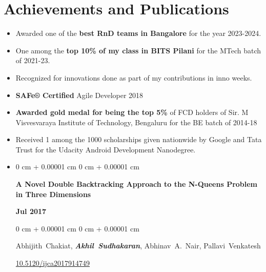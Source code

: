 \documentclass[10pt, letterpaper]{article}
\newenvironment{highlights}{
    \begin{itemize}[
        topsep=0.10 cm,
        parsep=0.10 cm,
        partopsep=0pt,
        itemsep=0pt,
        leftmargin=0 cm + 10pt
    ]
}{
    \end{itemize}
} %
\newenvironment{onecolentry}{
    \begin{adjustwidth}{
        0 cm + 0.00001 cm
    }{
        0 cm + 0.00001 cm
    }
}{
    \end{adjustwidth}
} %
\newenvironment{twocolentry}[2][]{
    \onecolentry
    \def\secondColumn{#2}
    \setcolumnwidth{\fill, 4.5 cm}
    \begin{paracol}{2}
}{
    \switchcolumn \raggedleft \secondColumn
    \end{paracol}
    \endonecolentry
} %
\begin{document}
    \section{Achievements and Publications}
        \begin{highlights}        
        \item Awarded one of the \textbf{best RnD teams in Bangalore} for the year 2023-2024.
        \item One among the \textbf{top 10\% of my class in BITS Pilani} for the MTech batch of 2021-23.
        \item Recognized for innovations done as part of my contributions in inno weeks.
        \item \textbf{SAFe® Certified} Agile Developer 2018
        \item \textbf{Awarded gold medal for being the top 5\%} of FCD holders of Sir. M Visvesvaraya Institute of Technology, Bengaluru for the BE batch of 2014-18
        \item Received 1 among the 1000 scholarships given nationwide by Google and Tata Trust for the Udacity Android Development Nanodegree. 
        \item \begin{samepage}
            \begin{twocolentry}{
                \textbf{Jul 2017}
            }
                \textbf{A Novel Double Backtracking Approach to the
 N-Queens Problem in Three Dimensions}
            \end{twocolentry}

            \vspace{0.10 cm}
            
            \begin{onecolentry}
                \mbox{Abhijith Chakiat}, \mbox{\textbf{\textit{Akhil Sudhakaran}}}, \mbox{Abhinav A. Nair}, \mbox{Pallavi Venkatesh}

                \vspace{0.10 cm}
                
        \href{https://doi.org/10.5120/ijca2017914749}{10.5120/ijca2017914749}
        \end{onecolentry}
        \end{samepage}
        \end{highlights}
\end{document}
